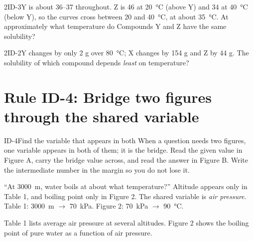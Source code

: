 \documentclass[11pt]{article}
\begin{document}
\begin{q}{2}{ID-3}{Y is about 36--37 throughout. Z is 46 at \SI{20}{\celsius} (above Y) and 34 at \SI{40}{\celsius} (below Y), so the curves cross between 20 and \SI{40}{\celsius}, at about \SI{35}{\celsius}.}
At approximately what temperature do Compounds Y and Z have the same solubility?
\end{q}

\begin{q}{2}{ID-2}{Y changes by only 2 g over \SI{80}{\celsius}; X changes by 154 g and Z by 44 g.}
The solubility of which compound depends \emph{least} on temperature?
\end{q}

\section{Rule ID-4: Bridge two figures through the shared variable}

\begin{rulebox}{ID-4}{Find the variable that appears in both}
When a question needs two figures, one variable appears in both of them; it is the bridge. Read the given value in Figure A, carry the bridge value across, and read the answer in Figure B. Write the intermediate number in the margin so you do not lose it.
\end{rulebox}

\begin{workedex}
``At \SI{3000}{\metre}, water boils at about what temperature?'' Altitude appears only in Table 1, and boiling point only in Figure 2. The shared variable is \emph{air pressure}. Table 1: \SI{3000}{\metre} $\to$ \SI{70}{\kilo\pascal}. Figure 2: \SI{70}{\kilo\pascal} $\to$ \SI{90}{\celsius}.
\end{workedex}


Table 1 lists average air pressure at several altitudes. Figure 2 shows the boiling point of pure water as a function of air pressure.
\end{document}

